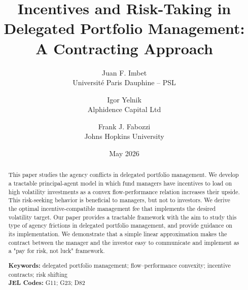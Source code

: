 \documentclass[11pt]{article}
\begin{document}
\begin{titlepage}
\title{\Large\bf Incentives and Risk-Taking in Delegated Portfolio Management: A Contracting Approach}
\author{\normalsize Juan F. Imbet\\ \normalsize Université Paris Dauphine -- PSL
\and
\normalsize Igor Yelnik\\ \normalsize Alphidence Capital Ltd
\and
\normalsize Frank J. Fabozzi\\ \normalsize Johns Hopkins University}
\date{May 2026}

\maketitle


\begin{abstract}
\noindent \small
This paper studies the agency conflicts in delegated portfolio management. We develop a tractable principal-agent model in which fund managers have incentives to load on high volatility investments as a convex flow-performance relation increases their upside. This risk-seeking behavior is beneficial to managers, but not to investors. We derive the optimal incentive-compatible management fee that implements the desired volatility target. Our paper provides a tractable framework with the aim to study this type of agency frictions in delegated portfolio management, and provide guidance on its implementation. We demonstrate that a simple linear approximation makes the contract between the manager and the investor easy to communicate and implement as a "pay for risk, not luck" framework.
\vspace{1cm}

\noindent\textbf{Keywords:} delegated portfolio management; flow–performance convexity; incentive contracts; risk shifting \\
\vspace{0in}
\noindent\textbf{JEL Codes:} G11; G23; D82

\bigskip
\end{abstract}

\setcounter{page}{0}
\thispagestyle{empty}
\end{titlepage}

\doublespacing
{}
\setlength{\parindent}{1cm}



\pagebreak


\pagebreak
{}


\normalsize

\clearpage
\appendix

\end{document}
